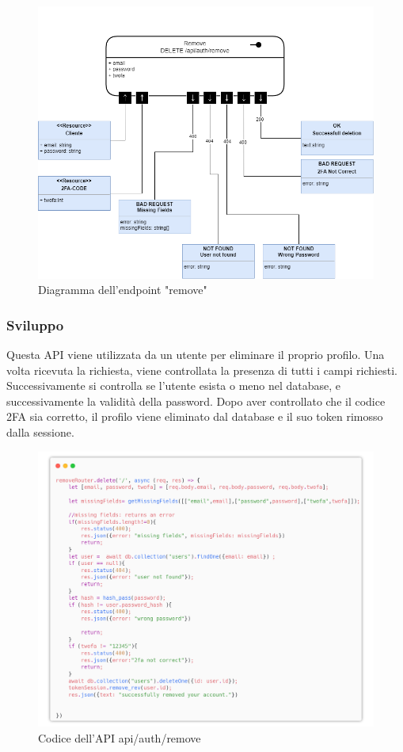 \documentclass{report}
\begin{document}
\begin{figure}[H]
	\centering\includegraphics[width=1\textwidth]{images/microservizio-autenticazione/diagrams/diagramma_remove.drawio.png}
	\caption{Diagramma dell'endpoint "remove"}
\end{figure}
\subsubsection*{Sviluppo}
Questa API viene utilizzata da un utente per eliminare il proprio profilo.
Una volta ricevuta la richiesta, viene controllata la presenza di tutti i campi richiesti.
Successivamente si controlla se l'utente esista o meno nel database, e successivamente la validità della password.
Dopo aver controllato che il codice 2FA sia corretto, il profilo viene eliminato dal database e il suo token rimosso dalla sessione.


\begin{figure}[H]
	\centering\includegraphics[width=1\textwidth]{images/microservizio-autenticazione/remove-carbon.png}
	Codice dell'API api/auth/remove
\end{figure}
\end{document}
